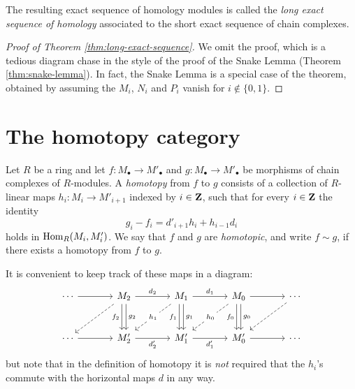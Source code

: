 The resulting exact sequence of homology modules is called the \emph{long exact sequence of homology} associated to the short exact sequence of chain complexes.

\begin{proof}[Proof of Theorem \ref{thm:long-exact-sequence}]
We omit the proof, which is a tedious diagram chase in the style of the proof of the Snake Lemma (Theorem \ref{thm:snake-lemma}). In fact, the Snake Lemma is a special case of the theorem, obtained by assuming the $M_i$, $N_i$ and $P_i$ vanish for $i\not\in \{0,1\}$.
\end{proof}

\section{The homotopy category}

\begin{definition}
Let $R$ be a ring and let $f\colon M_\bullet \to M'_\bullet$ and $g\colon M_\bullet \to M'_\bullet$ be morphisms of chain complexes of $R$-modules. A \emph{homotopy} from $f$ to $g$ consists of
a collection of $R$-linear maps $h_i\colon M_i \to M'_{i+1}$ indexed by $i\in {\mathbf{Z}}$, such that for every $i\in {\mathbf{Z}}$ the identity
\[
	g_i - f_i =  d'_{i+1} h_i + h_{i-1} d_i
\]
holds in $\operatorname{Hom}_R( M_i, M'_i )$. We say that $f$ and $g$ are \emph{homotopic}, and write $f\sim g$, if there exists a homotopy from $f$ to $g$. 
\end{definition}

It is convenient to keep track of these maps in a diagram:
\[
\begin{tikzcd}[row sep=large, column sep=large]
\cdots \arrow{r}
	& M_{2} \arrow{r}{d_{2}} 
		\arrow[transform canvas={xshift=-.5ex},swap]{d}{f_{2}} 
		\arrow[transform canvas={xshift=.5ex}]{d}{g_{2}} 
		\arrow[dashed]{dl}{}
	& M_{1} \arrow{r}{d_{1}}  
		\arrow[transform canvas={xshift=-.5ex},swap]{d}{f_{1}} 
		\arrow[transform canvas={xshift=.5ex}]{d}{g_{1}} 
		\arrow[dashed]{dl}[description]{h_1}
	& M_{0} \arrow{r} 
		\arrow[transform canvas={xshift=-.5ex},swap]{d}{f_{0}} 
		\arrow[transform canvas={xshift=.5ex}]{d}{g_{0}} 
		\arrow[dashed]{dl}[description]{h_0}
	& \cdots \arrow[dashed]{dl}{} \\
\cdots \arrow{r}
	& M'_{2} \arrow[swap]{r}{d'_{2}} 
	& M'_{1} \arrow[swap]{r}{d'_{1}} 
	& M'_{0} \arrow[swap]{r} 
	& \cdots 
\end{tikzcd}
\]
but note that in the definition of homotopy it is \emph{not} required that the $h_i$'s commute with the horizontal maps $d$ in any way.

